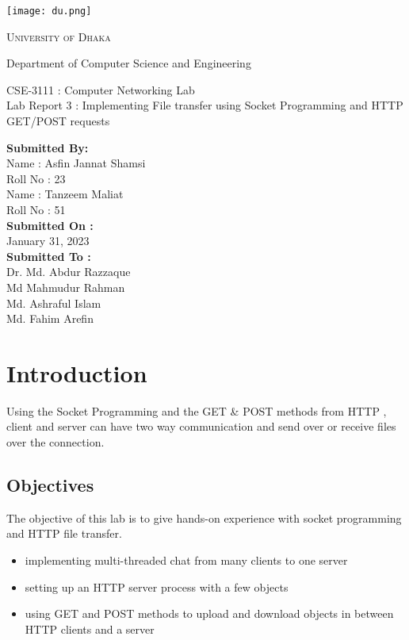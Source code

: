 \documentclass[11pt]{article}
\begin{document}
\begin{titlepage}
	\begin{center}
    	\texttt{[image: du.png]}\par
		\begin{Huge}
			\textsc{University of Dhaka}\par
		\end{Huge}
		\begin{Large}
			Department of Computer Science and Engineering\par \vspace{1cm}
			CSE-3111 : Computer Networking Lab \\[12pt]	
			Lab Report 3 : Implementing File transfer using Socket Programming and HTTP GET/POST requests
		\end{Large}
	\end{center}  	
	\begin{large}
		\textbf{Submitted By:\\[12pt]}
			Name : Asfin Jannat Shamsi\\[8pt]
			Roll No : 23\\[12pt]
			Name : Tanzeem Maliat\\[8pt]
			Roll No : 51\\[12pt]
		\textbf{Submitted On : \\[12pt]}
			January 31, 2023\\[20pt]
		\textbf{Submitted To :\\[12pt]}
			Dr. Md. Abdur Razzaque\\[12pt]
                Md Mahmudur Rahman\\[12pt]
                Md. Ashraful Islam\\[12pt]
                Md. Fahim Arefin
	\end{large}
\end{titlepage}

\section{Introduction}
Using the Socket Programming and the GET & POST methods from HTTP , client and server can have two way communication and send over or receive files over the connection.
\item 
\item 
\item 

\subsection{Objectives}
The objective of this lab is to give hands-on experience with socket programming and HTTP file transfer. 
\begin{itemize}
    \item implementing multi-threaded chat from many clients to one server 
    \item setting up an HTTP server process with a few objects
    \item using GET and POST methods to upload and download objects in between HTTP clients and a server
\end{itemize}
\end{document}
